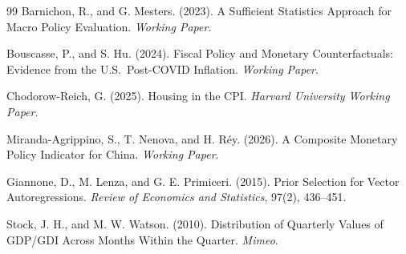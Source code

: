 \documentclass[12pt, a4paper]{article}
\begin{document}
\begin{thebibliography}{99}
Barnichon, R., and G. Mesters. (2023).
\newblock A Sufficient Statistics Approach for Macro Policy Evaluation.
\newblock \textit{Working Paper}.

Bouscasse, P., and S. Hu. (2024).
\newblock Fiscal Policy and Monetary Counterfactuals: Evidence from the U.S.\ Post-COVID Inflation.
\newblock \textit{Working Paper}.

Chodorow-Reich, G. (2025).
\newblock Housing in the CPI.
\newblock \textit{Harvard University Working Paper}.

Miranda-Agrippino, S., T. Nenova, and H. R\'ey. (2026).
\newblock A Composite Monetary Policy Indicator for China.
\newblock \textit{Working Paper}.

Giannone, D., M. Lenza, and G. E. Primiceri. (2015).
\newblock Prior Selection for Vector Autoregressions.
\newblock \textit{Review of Economics and Statistics}, 97(2), 436--451.

Stock, J. H., and M. W. Watson. (2010).
\newblock Distribution of Quarterly Values of GDP/GDI Across Months Within the Quarter.
\newblock \textit{Mimeo}.

\end{thebibliography}
\end{document}
